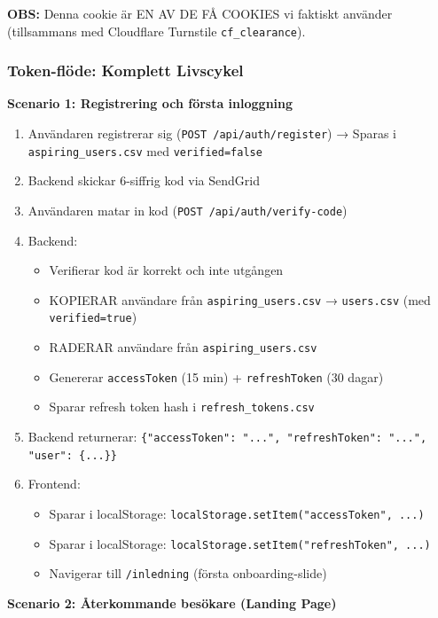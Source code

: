 \documentclass[12pt,a4paper]{article}
\begin{document}
\textbf{OBS:} Denna cookie är EN AV DE FÅ COOKIES vi faktiskt använder (tillsammans med Cloudflare Turnstile \texttt{cf\_clearance}).

\subsubsection{Token-flöde: Komplett Livscykel}

\textbf{Scenario 1: Registrering och första inloggning}

\begin{enumerate}[noitemsep]
  \item Användaren registrerar sig (\texttt{POST /api/auth/register}) → Sparas i \texttt{aspiring\_users.csv} med \texttt{verified=false}
  \item Backend skickar 6-siffrig kod via SendGrid
  \item Användaren matar in kod (\texttt{POST /api/auth/verify-code})
  \item Backend:
    \begin{itemize}[noitemsep]
      \item Verifierar kod är korrekt och inte utgången
      \item KOPIERAR användare från \texttt{aspiring\_users.csv} → \texttt{users.csv} (med \texttt{verified=true})
      \item RADERAR användare från \texttt{aspiring\_users.csv}
      \item Genererar \texttt{accessToken} (15 min) + \texttt{refreshToken} (30 dagar)
      \item Sparar refresh token hash i \texttt{refresh\_tokens.csv}
    \end{itemize}
  \item Backend returnerar: \texttt{\{"accessToken": "...", "refreshToken": "...", "user": \{...\}\}}
  \item Frontend:
    \begin{itemize}[noitemsep]
      \item Sparar i localStorage: \texttt{localStorage.setItem("accessToken", ...)}
      \item Sparar i localStorage: \texttt{localStorage.setItem("refreshToken", ...)}
      \item Navigerar till \texttt{/inledning} (första onboarding-slide)
    \end{itemize}
\end{enumerate}

\textbf{Scenario 2: Återkommande besökare (Landing Page)}
\end{document}
